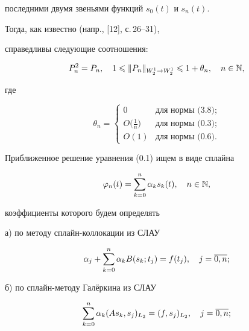 последними двумя звеньями функций $s_0(t)$ и $s_n(t)$.


Тогда, как известно (напр., [12], с.\,26--31), 


справедливы следующие соотношения:


\begin{equation}


P_n^2=P_n,\quad 1\lea \|P_n\|_{W_2^1\to W_2^1} \lea 1+\theta_n,\quad n\in\N,


\end{equation}


где 


$$


\theta_n =


\begin{cases}


0 & \text{для нормы (3.8)}; \\


O\big(\frac{1}{n}\big) & \text{для нормы (0.3)}; \\


O(1) & \text{для нормы (0.6)}.


\end{cases}


$$





Приближенное решение уравнения (0.1) ищем в виде сплайна 


\begin{equation}


\vp_n(t) = \suml_{k=0}^n \alpha_k s_k(t),\quad n\in \N,


\end{equation}


коэффициенты которого будем определять





а) по методу сплайн-коллокации из СЛАУ


\begin{equation}


\alpha_j + \suml_{k=0}^n \alpha_k B(s_k;t_j) = f(t_j),\quad j=\ol{0,n};


\end{equation}





б) по сплайн-методу Гал\"еркина из СЛАУ 


\begin{equation}


\suml_{k=0}^n\alpha_k(As_k,s_j)_{L_2} = (f,s_j)_{L_2},\quad j=\ol{0,n};


\end{equation}





